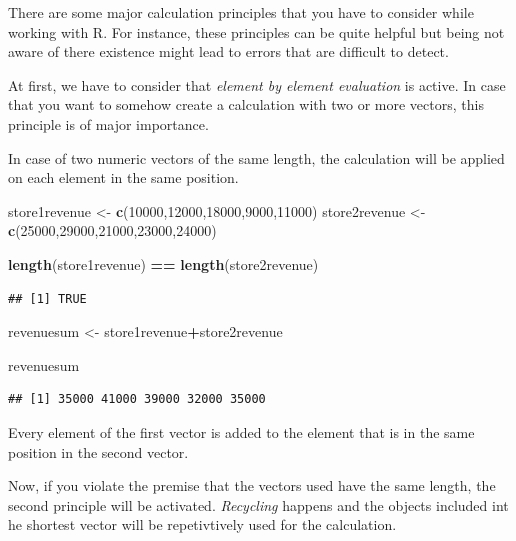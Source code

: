 \documentclass[]{report}
\newenvironment{Shaded}{\begin{snugshade}}{\end{snugshade}}
\newcommand{\KeywordTok}[1]{\textcolor[rgb]{0.13,0.29,0.53}{\textbf{#1}}}
\newcommand{\DecValTok}[1]{\textcolor[rgb]{0.00,0.00,0.81}{#1}}
\newcommand{\StringTok}[1]{\textcolor[rgb]{0.31,0.60,0.02}{#1}}
\newcommand{\OperatorTok}[1]{\textcolor[rgb]{0.81,0.36,0.00}{\textbf{#1}}}
\newcommand{\NormalTok}[1]{#1}
\begin{document}
There are some major calculation principles that you have to consider
while working with R. For instance, these principles can be quite
helpful but being not aware of there existence might lead to errors that
are difficult to detect.

At first, we have to consider that \emph{element by element evaluation}
is active. In case that you want to somehow create a calculation with
two or more vectors, this principle is of major importance.

In case of two numeric vectors of the same length, the calculation will
be applied on each element in the same position.

\begin{Shaded}
\begin{Highlighting}[]
\NormalTok{store1revenue <-}\StringTok{ }\KeywordTok{c}\NormalTok{(}\DecValTok{10000}\NormalTok{,}\DecValTok{12000}\NormalTok{,}\DecValTok{18000}\NormalTok{,}\DecValTok{9000}\NormalTok{,}\DecValTok{11000}\NormalTok{)}
\NormalTok{store2revenue <-}\StringTok{ }\KeywordTok{c}\NormalTok{(}\DecValTok{25000}\NormalTok{,}\DecValTok{29000}\NormalTok{,}\DecValTok{21000}\NormalTok{,}\DecValTok{23000}\NormalTok{,}\DecValTok{24000}\NormalTok{)}

\KeywordTok{length}\NormalTok{(store1revenue) }\OperatorTok{==}\StringTok{ }\KeywordTok{length}\NormalTok{(store2revenue)}
\end{Highlighting}
\end{Shaded}

\begin{verbatim}
## [1] TRUE
\end{verbatim}

\begin{Shaded}
\begin{Highlighting}[]
\NormalTok{revenuesum <-}\StringTok{ }\NormalTok{store1revenue}\OperatorTok{+}\NormalTok{store2revenue}

\NormalTok{revenuesum}
\end{Highlighting}
\end{Shaded}

\begin{verbatim}
## [1] 35000 41000 39000 32000 35000
\end{verbatim}

Every element of the first vector is added to the element that is in the
same position in the second vector.

Now, if you violate the premise that the vectors used have the same
length, the second principle will be activated. \emph{Recycling} happens
and the objects included int he shortest vector will be repetivtively
used for the calculation.
\end{document}
